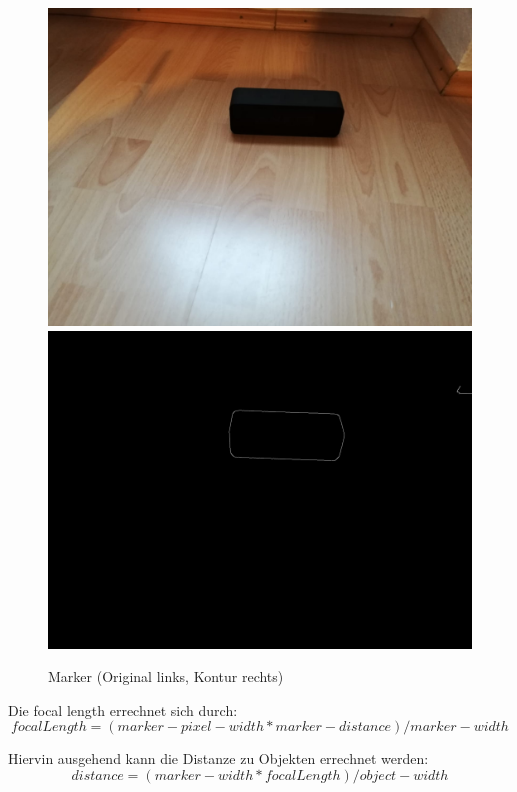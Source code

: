 \begin{figure}[H]
    \centering
    \includegraphics[scale=0.1]{./img/marker.jpg}
    \includegraphics[scale=0.1]{./img/marker_gray.jpg}
    \caption{Marker (Original links, Kontur rechts)}
    \label{fig:marker}
\end{figure}

Die focal length errechnet sich durch:
\begin{equation}
    focalLength = (marker-pixel-width * marker-distance) / marker-width
    \label{equ:focalLength}
\end{equation}

Hiervin ausgehend kann die Distanze zu Objekten errechnet werden:
\begin{equation}
    distance = (marker-width * focalLength) / object-width
    \label{equ:distance}
\end{equation}

